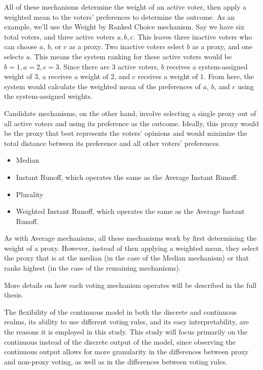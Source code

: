 All of these mechanisms determine the weight of an active voter, then apply a
weighted mean to the voters' preferences to determine the outcome.
As an example, we'll use the Weight by Ranked Choice mechanism.
Say we have six total voters, and three active voters $a, b, c$.
This leaves three inactive voters who can choose $a$, $b$, or $c$ as a proxy.
Two inactive voters select $b$ as a proxy, and one selects $a$.
This means the system ranking for these active voters would be $b = 1, a = 2, c = 3$.
Since there are 3 active voters, $b$ receives a system-assigned weight of 3, a
receives a weight of 2, and c receives a weight of 1.
From here, the system would calculate the weighted mean of the preferences of $a$,
$b$, and $c$ using the system-assigned weights.

Candidate mechanisms, on the other hand, involve selecting a single proxy out of all
active voters and using its preference as the outcome.
Ideally, this proxy would be the proxy that best represents the voters' opinions and
would minimize the total distance between its preference and all other voters'
preferences.
\begin{itemize}
    \item Median
    \item Instant Runoff, which operates the same as the Average Instant Runoff.
    \item Plurality
    \item Weighted Instant Runoff, which operates the same as the Average Instant
    Runoff.
\end{itemize}
As with Average mechanisms, all these mechanisms work by first determining the weight
of a proxy.
However, instead of then applying a weighted mean, they select the proxy that is
at the median (in the case of the Median mechanism) or that ranks highest (in the case
of the remaining mechanisms).

More details on how each voting mechanism operates will be described in the full thesis.

The flexibility of the continuous model in both the discrete and continuous realms, its
ability to use different voting rules, and its easy interpretability, are the reasons
it is employed in this study.
This study will focus primarily on the continuous instead of the discrete output of
the model, since observing the continuous output allows for more granularity in the
differences between proxy and non-proxy voting, as well as in the differences between
voting rules.

